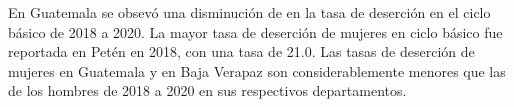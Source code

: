 En Guatemala se obsevó una disminución de en la tasa de deserción en el ciclo básico de 2018 a 2020. La mayor tasa de deserción de mujeres en ciclo básico fue reportada en Petén en 2018, con una tasa de 21.0. Las tasas de deserción de mujeres en Guatemala y en Baja Verapaz son considerablemente menores que las de los hombres de 2018 a 2020 en sus respectivos departamentos. 
